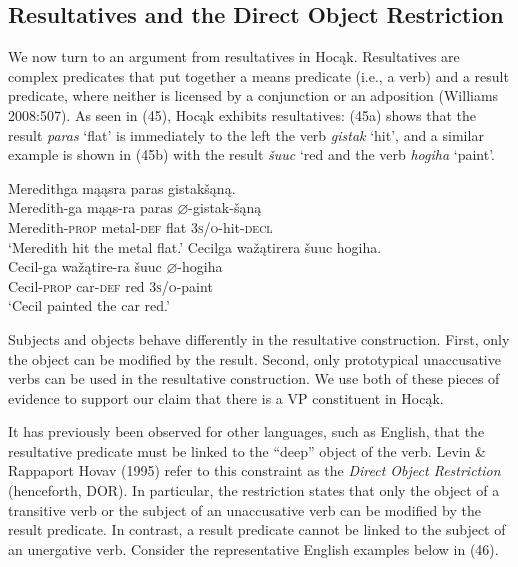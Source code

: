 \documentclass[output=paper]{LSP/langsci}
\begin{document}
\subsection{Resultatives and the Direct Object Restriction}

We now turn to an argument from resultatives in Hoc\k{a}k. Resultatives are complex predicates that put together a means predicate (i.e., a verb) and a result predicate, where neither is licensed by a conjunction or an adposition (Williams 2008:507). As seen in (45), Hoc\k{a}k exhibits resultatives: (45a) shows that the result \textit{paras} `flat' is immediately to the left the verb \textit{gistak} `hit', and a similar example is shown in (45b) with the result \textit{\v{s}uuc} `red and the verb \textit{hogiha} `paint'.

\begin{exe}
\ex
\begin{xlist}
\ex 
\glll Meredithga	m\k{a}\k{a}sra		paras	gistak\v{s}\k{a}n\k{a}.\\
Meredith-ga			m\k{a}\k{a}s-ra	paras	$\varnothing$-gistak-\v{s}\k{a}n\k{a} \\
	Meredith-\textsc{prop}		metal-\textsc{def}		flat	 \textsc{3s/o}-hit-\textsc{decl} \\
\trans `Meredith hit the metal flat.'
\ex 
\glll Cecilga	wa\v{z}\k{a}tirera	 \v{s}uuc	hogiha.\\
Cecil-ga	wa\v{z}\k{a}tire-ra \v{s}uuc	$\varnothing$-hogiha \\
	Cecil-\textsc{prop}	car-\textsc{def}	red		\textsc{3s/o}-paint \\
\trans `Cecil painted the car red.'
\end{xlist}
\end{exe}

Subjects and objects behave differently in the resultative construction. First, only the object can be modified by the result. Second, only prototypical unaccusative verbs can be used in the resultative construction. We use both of these pieces of evidence to support our claim that there is a VP constituent in Hoc\k{a}k.

It has previously been observed for other languages, such as English, that the resultative predicate must be linked to the ``deep'' object of the verb. Levin \& Rappaport Hovav (1995) refer to this constraint as the \textit{Direct Object Restriction} (henceforth, DOR). In particular, the restriction states that only the object of a transitive verb or the subject of an unaccusative verb can be modified by the result predicate. In contrast, a result predicate cannot be linked to the subject of an unergative verb. Consider the representative English examples below in (46).
\end{document}
